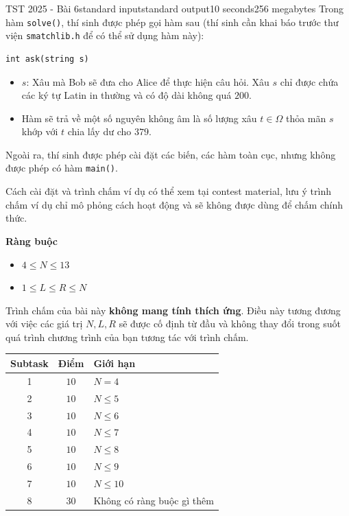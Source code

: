 \begin{problem}{TST 2025 - Bài 6}{standard input}{standard output}{10 seconds}{256 megabytes}
Trong hàm \texttt{solve()}, thí sinh được phép gọi hàm sau (thí sinh cần khai báo trước thư viện \texttt{smatchlib.h} để có thể sử dụng hàm này):

\begin{lstlisting}
int ask(string s)
\end{lstlisting}

\begin{itemize}
   \item $s$: Xâu mà Bob sẽ đưa cho Alice để thực hiện câu hỏi. Xâu $s$ chỉ được chứa các ký tự Latin in thường và có độ dài không quá $200$.
   \item Hàm sẽ trả về một số nguyên không âm là số lượng xâu $t\in \Omega$ thỏa mãn $s$ khớp với $t$ chia lấy dư cho $379$.
\end{itemize}

Ngoài ra, thí sinh được phép cài đặt các biến, các hàm toàn cục, nhưng không được phép có hàm \texttt{main()}.

Cách cài đặt và trình chấm ví dụ có thể xem tại contest material, lưu ý trình chấm ví dụ chỉ mô phỏng cách hoạt động và sẽ không được dùng để chấm chính thức.

\textbf{Ràng buộc}

\begin{itemize}
   \item $4\le N\le 13$
   \item $1\le L\le R\le N$
\end{itemize}

Trình chấm của bài này \textbf{không mang tính thích ứng}. Điều này tương đương với việc các giá trị $N,L,R$ sẽ được cố định từ đầu và không thay đổi trong suốt quá trình chương trình của bạn tương tác với trình chấm.

\Scoring
\begin{center}
  \begin{tabular}{|c|c|l|} \hline
    \textbf{Subtask} & \textbf{Điểm} & \textbf{Giới hạn} \\ \hline
    1 & $10$ & $N=4$ \\ \hline
    2 & $10$ & $N\le 5$ \\ \hline
    3 & $10$ & $N\le 6$ \\ \hline
    4 & $10$ & $N\le 7$ \\ \hline
    5 & $10$ & $N\le 8$ \\ \hline
    6 & $10$ & $N\le 9$ \\ \hline
    7 & $10$ & $N\le 10$ \\ \hline
    8 & $30$ & Không có ràng buộc gì thêm \\ \hline
  \end{tabular}
\end{center}


\end{problem}
